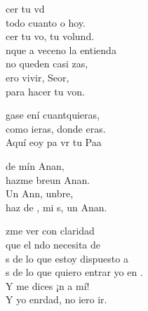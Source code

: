 \documentclass[12pt]{article}
\begin{document}
\begin{multicols*}{2}
\begin{cancion}%
	cer tu vd \\
	 todo cuanto o hoy.\\
	cer tu vo, tu volund.\\
	nque a veceno la entienda\\
	no queden casi zas,\\
	ero vivir, Seor,\\
	para hacer tu von.\\
\end{cancion}%

\begin{cancion}[Hágase][Ixcís]%
	gase ení cuantquieras, \\
	como ieras, donde eras.\\
	Aquí eoy pa vr tu Paa\\
\end{cancion}%

\begin{cancion}%
	 de mín Anan, \\
	hazme breun Anan.\\
	Un Ann, unbre,\\
	haz de , mi s, un Anan. \\
\end{cancion}%

\begin{cancion}%
	zme ver con claridad\\
	que el ndo necesita de \\
	s de lo que estoy dispuesto a  \\
	s de lo que quiero entrar yo en . \\
	Y  me dices ¡n a mí!  \\
	Y yo enrdad, no iero ir.\\
\end{cancion}%


\end{multicols*}
\end{document}
